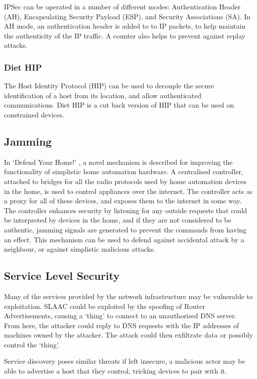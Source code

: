 \documentclass[10pt,journal,compsoc]{IEEEtran}
\begin{document}
IPSec can be operated in a number of different modes: Authentication Header
(AH), Encapsulating Security Payload (ESP), and Security Associations (SA).
In AH mode, an authentication header is added to to IP packets, to help
maintain the authenticity of the IP traffic. A counter also helps to prevent
against replay attacks. 

\subsubsection{Diet HIP}
The Host Identity Protocol (HIP) can be used to decouple the secure
identification of a host from its location, and allow authenticated
communications. Diet HIP is a cut back version of HIP that can be used on
constrained devices. 

\subsection{Jamming}
In `Defend Your Home!' \cite{Brown2013}, a novel mechanism is described for
improving the functionality of simplistic home automation hardware. A
centralised controller, attached to bridges for all the radio protocols used by
home automation devices in the home, is used to control appliances over the
internet. The  controller acts as a proxy for all of these devices, and exposes
them to the internet in some way. The controller  enhances security by
listening for any outside requests that could be interpreted by devices in the
home, and if they are not considered to be authentic, jamming signals are
generated to prevent the commands from having an effect. This mechanism can be
used to defend against accidental attack by a neighbour, or against simplistic
malicious attacks. 

\subsection{Service Level Security}
Many of the services provided by the network infrastructure may be vulnerable
to exploitation. SLAAC could be exploited by the spoofing of Router
Advertisements, causing a `thing' to connect to an unauthorised DNS server.
From here, the attacker could reply to DNS requests with the IP addresses of
machines owned by the attacker. The attack could then exfiltrate data or
possibly control the `thing'.

Service discovery poses similar threats if left insecure, a malicious actor may
be able to advertise a host that they control, tricking devices to pair with
it.
\end{document}
